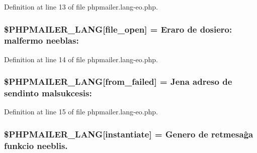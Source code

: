 Definition at line 13 of file phpmailer.\+lang-\/eo.\+php.

\subsubsection[{\texorpdfstring{\$\+P\+H\+P\+M\+A\+I\+L\+E\+R\+\_\+\+L\+A\+NG}{$PHPMAILER_LANG}}]{\setlength{\rightskip}{0pt plus 5cm}\$P\+H\+P\+M\+A\+I\+L\+E\+R\+\_\+\+L\+A\+NG\mbox{[}\textquotesingle{}file\+\_\+open\textquotesingle{}\mbox{]} = \textquotesingle{}Eraro de dosiero\+: malfermo neeblas\+: \textquotesingle{}}\hypertarget{phpmailer_8lang-eo_8php_a28d1a6517bf4c942a0ddd506188ad2e0}{}\label{phpmailer_8lang-eo_8php_a28d1a6517bf4c942a0ddd506188ad2e0}


Definition at line 14 of file phpmailer.\+lang-\/eo.\+php.

\subsubsection[{\texorpdfstring{\$\+P\+H\+P\+M\+A\+I\+L\+E\+R\+\_\+\+L\+A\+NG}{$PHPMAILER_LANG}}]{\setlength{\rightskip}{0pt plus 5cm}\$P\+H\+P\+M\+A\+I\+L\+E\+R\+\_\+\+L\+A\+NG\mbox{[}\textquotesingle{}from\+\_\+failed\textquotesingle{}\mbox{]} = \textquotesingle{}Jena adreso de sendinto malsukcesis\+: \textquotesingle{}}\hypertarget{phpmailer_8lang-eo_8php_adf832ae12155a09be077c6d5e4fd7e22}{}\label{phpmailer_8lang-eo_8php_adf832ae12155a09be077c6d5e4fd7e22}


Definition at line 15 of file phpmailer.\+lang-\/eo.\+php.

\subsubsection[{\texorpdfstring{\$\+P\+H\+P\+M\+A\+I\+L\+E\+R\+\_\+\+L\+A\+NG}{$PHPMAILER_LANG}}]{\setlength{\rightskip}{0pt plus 5cm}\$P\+H\+P\+M\+A\+I\+L\+E\+R\+\_\+\+L\+A\+NG\mbox{[}\textquotesingle{}instantiate\textquotesingle{}\mbox{]} = \textquotesingle{}Genero de retmesaĝa funkcio neeblis.\textquotesingle{}}\hypertarget{phpmailer_8lang-eo_8php_ad58dde16780f4770ccf4dd282ea1f5ad}{}\label{phpmailer_8lang-eo_8php_ad58dde16780f4770ccf4dd282ea1f5ad}


